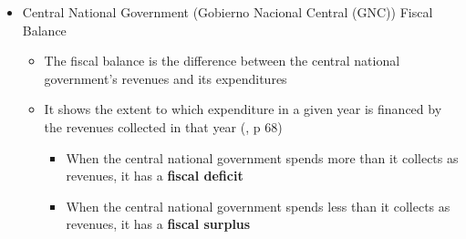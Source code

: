\documentclass[
  ignorenonframetext,
]{beamer}
\begin{document}
\begin{frame}{}
\label{section-6}
\begin{itemize}
\item
  Central National Government (Gobierno Nacional Central (GNC)) Fiscal
  Balance

  \begin{itemize}
  \item
    The fiscal balance is the difference between the central national
    government's revenues and its expenditures
  \item
    It shows the extent to which expenditure in a given year is financed
    by the revenues collected in that year
    (, p 68)

    \begin{itemize}
    \item
      When the central national government spends more than it collects
      as revenues, it has a \textbf{fiscal deficit}
    \item
      When the central national government spends less than it collects
      as revenues, it has a \textbf{fiscal surplus}
    \end{itemize}
  \end{itemize}
\end{itemize}
\end{frame}
\end{document}

